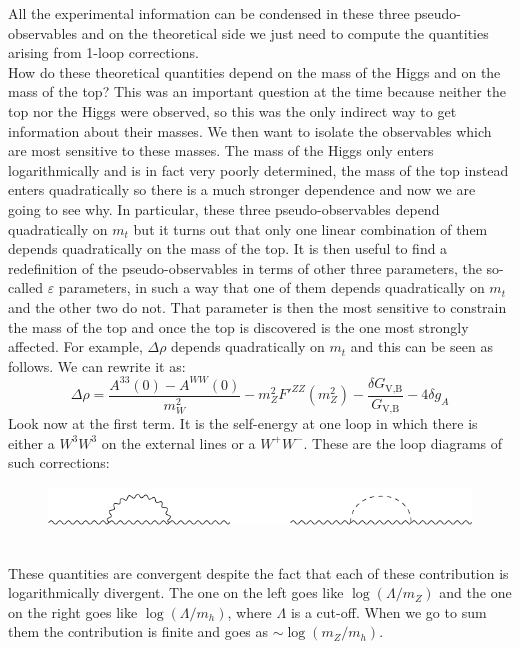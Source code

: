 \documentclass[../main.tex]{subfiles}
\begin{document}
All the experimental information can be condensed in these three pseudo-observables and on the theoretical side we just need to compute the quantities arising from 1-loop corrections.\\
How do these theoretical quantities depend on the mass of the Higgs and on the mass of the top? This was an important question at the time because neither the top nor the Higgs were observed, so this was the only indirect way to get information about their masses. We then want to isolate the observables which are most sensitive to these masses. The mass of the Higgs only enters logarithmically and is in fact very poorly determined, the mass of the top instead enters quadratically so there is a much stronger dependence and now we are going to see why. In particular, these three pseudo-observables depend quadratically on $m_t$ but it turns out that only one linear combination of them depends quadratically on the mass of the top. It is then useful to find a redefinition of the pseudo-observables in terms of other three parameters, the so-called $\varepsilon$ parameters, in such a way that one of them depends quadratically on $m_t$ and the other two do not. That parameter is then the most sensitive to constrain the mass of the top and once the top is discovered is the one most strongly affected. For example, $\Delta\rho$ depends quadratically on $m_t$ and this can be seen as follows. We can rewrite it as:
\[
\Delta\rho=\frac{A^{33}(0)-A^{WW}(0)}{m_W^2}-m_Z^2F'^{ZZ}(m_Z^2)-\frac{\delta G_{\text{V,B}}}{G_{\text{V,B}}}-4\delta g_A
\]
Look now at the first term. It is the self-energy at one loop in which there is either a $W^3W^3$ on the external lines or a $W^+W^-$. These are the loop diagrams of such corrections:
\begin{figure}[h]
    \centering
    \includegraphics{Images/loopcorr.pdf}
    \caption*{}
\end{figure}\\
These quantities are convergent despite the fact that each of these contribution is logarithmically divergent. The one on the left goes like $\log(\Lambda/m_Z)$ and the one on the right goes like $\log(\Lambda/m_h)$, where $\Lambda$ is a cut-off. When we go to sum them the contribution is finite and goes as $\sim\log(m_Z/m_h)$.\\
\end{document}
